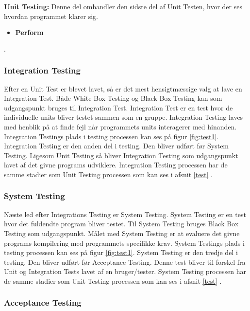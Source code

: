 \textbf{Unit Testing:} Denne del omhandler den sidste del af Unit Testen, hvor der ses hvordan programmet klarer sig.

\begin{itemize}
\item{\textbf{Perform}}
\end{itemize}

\citep{Fundamentals2011}.

\subsubsection{Integration Testing}

Efter en Unit Test er blevet lavet, så er det mest hensigtmæssige valg at lave en Integration Test. Både White Box Testing og Black Box Testing kan som udgangspunkt bruges til Integration Test. Integration Test er en test hvor de individuelle units bliver testet sammen som en gruppe. Integration Testing laves med henblik på at finde fejl når programmets units interagerer med hinanden. Integration Testings plads i testing processen kan ses på figur \ref{fig:test1}. Integration Testing er den anden del i testing. Den bliver udført før System Testing. Ligesom Unit Testing så bliver Integration Testing som udgangspunkt lavet af det givne programs udviklere. Integration Testing processen har de samme stadier som Unit Testing processen som kan ses i afsnit \ref{test} \citep{Fundamentals2011Integration}.

\subsubsection{System Testing}

Næste led efter Integrations Testing er System Testing. System Testing er en test hvor det fuldendte program bliver testet. Til System Testing bruges Black Box Testing som udgangspunkt. Målet med System Testing er at evaluere det givne programs kompilering med programmets specifikke krav. System Testings plads i testing processen kan ses på figur \ref{fig:test1}. System Testing er den tredje del i testing. Den bliver udført før Acceptance Testing. Denne test bliver til forskel fra Unit og Integration Tests lavet af en bruger/tester. System Testing processen har de samme stadier som Unit Testing processen som kan ses i afsnit \ref{test} \citep{Fundamentals2011System}.

\subsubsection{Acceptance Testing}

